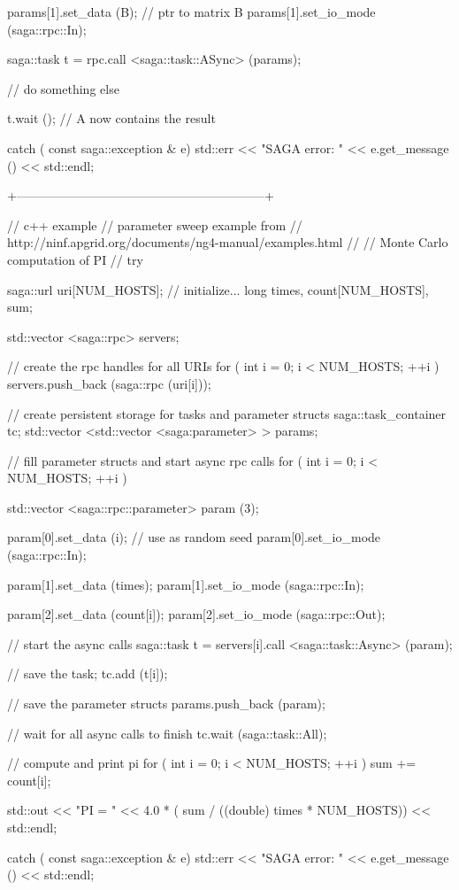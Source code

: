 \begin{mycode}
{    params[1].set_data (B); // ptr to matrix B
    params[1].set_io_mode (saga::rpc::In);
 
    saga::task t = rpc.call <saga::task::ASync> (params);
 
    // do something else
 
    t.wait ();
    // A now contains the result
  }
  catch ( const saga::exception & e)
  {
    std::err << "SAGA error: " 
             << e.get_message () 
             << std::endl;
  }
 
  +------------------------------------------------------------+
 
  // c++ example
  // parameter sweep example from
  // http://ninf.apgrid.org/documents/ng4-manual/examples.html
  //
  // Monte Carlo computation of PI
  //
  try 
  {
    saga::url     uri[NUM_HOSTS]; // initialize...
    long times, count[NUM_HOSTS], sum;
 
    std::vector <saga::rpc> servers;
 
    // create the rpc handles for all URIs
    for ( int i = 0; i < NUM_HOSTS; ++i )
    {
      servers.push_back (saga::rpc (uri[i]));
    }
 
    // create persistent storage for tasks and parameter structs
    saga::task_container tc;
    std::vector <std::vector <saga:parameter> > params;
 
    // fill parameter structs and start async rpc calls
    for ( int i = 0; i < NUM_HOSTS; ++i )
    {
      std::vector <saga::rpc::parameter> param (3);
 
      param[0].set_data (i); // use as random seed
      param[0].set_io_mode (saga::rpc::In);
 
      param[1].set_data (times);
      param[1].set_io_mode (saga::rpc::In);
 
      param[2].set_data (count[i]);
      param[2].set_io_mode (saga::rpc::Out);
 
      // start the async calls
      saga::task t = servers[i].call <saga::task::Async> (param);
 
      // save the task;
      tc.add (t[i]);
 
      // save the parameter structs
      params.push_back (param);
    }
 
    // wait for all async calls to finish
    tc.wait (saga::task::All);
 
    // compute and print pi
    for ( int i = 0; i < NUM_HOSTS; ++i )
    {
      sum += count[i];
    }
 
    std::out << "PI = " 
             << 4.0 * ( sum / ((double) times * NUM_HOSTS))
             << std::endl;
  }
  catch ( const saga::exception & e)
  {
    std::err << "SAGA error: " 
             << e.get_message () 
             << std::endl;
  }
 \end{mycode}
 
